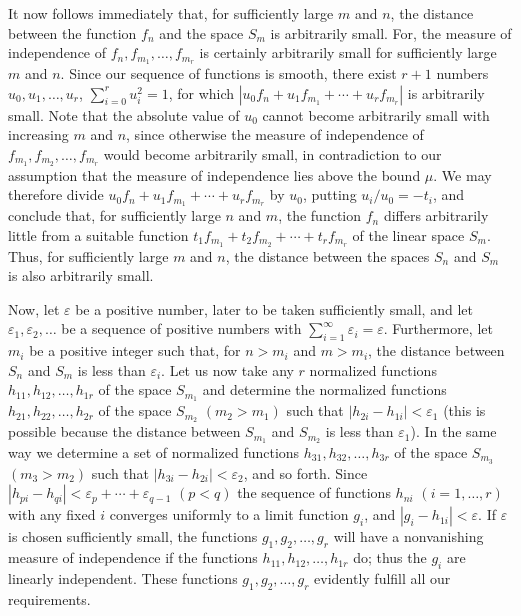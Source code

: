 It now follows immediately that, for sufficiently large $m$ and $n$, the distance between the function $f_n$ and the space $S_m$ is arbitrarily small. For, the measure of independence of $f_n,f_{m_1},\ldots,f_{m_r}$ is certainly arbitrarily small for sufficiently large $m$ and $n$. Since our sequence of functions is smooth, there exist $r+1$ numbers $u_0,u_1,\ldots,u_r$, $\sum_{i=0}^{r}u_i^2=1$, for which $|u_0f_n+u_1f_{m_1}+\cdots+u_rf_{m_r}|$ is arbitrarily small. Note that the absolute value of $u_0$ cannot become arbitrarily small with increasing $m$ and $n$, since otherwise the measure of independence of $f_{m_1},f_{m_2},\ldots,f_{m_r}$ would become arbitrarily small, in contradiction to our assumption that the measure of independence lies above the bound $\mu$. We may therefore divide $u_0f_n+u_1f_{m_1}+\cdots+u_rf_{m_r}$ by $u_0$, putting $u_i/u_0=-t_i$, and conclude that, for sufficiently large $n$ and $m$, the function $f_n$ differs arbitrarily little from a suitable function $t_1f_{m_1}+t_2f_{m_2}+\cdots+t_rf_{m_r}$ of the linear space $S_m$. Thus, for sufficiently large $m$ and $n$, the distance between the spaces $S_n$ and $S_m$ is also arbitrarily small.

Now, let $\varepsilon$ be a positive number, later to be taken sufficiently small, and let $\varepsilon_1,\varepsilon_2,\ldots$ be a sequence of positive numbers with $\sum_{i=1}^{\infty}\varepsilon_i=\varepsilon$. Furthermore, let $m_i$ be a positive integer such that, for $n>m_i$ and $m>m_i$, the distance between $S_n$ and $S_m$ is less than $\varepsilon_i$. Let us now take any $r$ normalized functions $h_{11},h_{12},\ldots,h_{1r}$ of the space $S_{m_1}$ and determine the normalized functions $h_{21},h_{22},\ldots,h_{2r}$ of the space $S_{m_2}$ $(m_2>m_1)$ such that $|h_{2i}-h_{1i}|<\varepsilon_1$ (this is possible because the distance between $S_{m_1}$ and $S_{m_2}$ is less than $\varepsilon_1$). In the same way we determine a set of normalized functions $h_{31},h_{32},\ldots,h_{3r}$ of the space $S_{m_3}$ $(m_3>m_2)$ such that $|h_{3i}-h_{2i}|<\varepsilon_2$, and so forth. Since $|h_{pi}-h_{qi}|<\varepsilon_p+\cdots+\varepsilon_{q-1}$ $(p<q)$ the sequence of functions $h_{ni}$ $(i=1,\ldots,r)$ with any fixed $i$ converges uniformly to a limit function $g_i$, and $|g_i-h_{1i}|<\varepsilon$. If $\varepsilon$ is chosen sufficiently small, the functions $g_1,g_2,\ldots,g_r$ will have a nonvanishing measure of independence if the functions $h_{11},h_{12},\ldots,h_{1r}$ do; thus the $g_i$ are linearly independent. These functions $g_1,g_2,\ldots,g_r$ evidently fulfill all our requirements.

